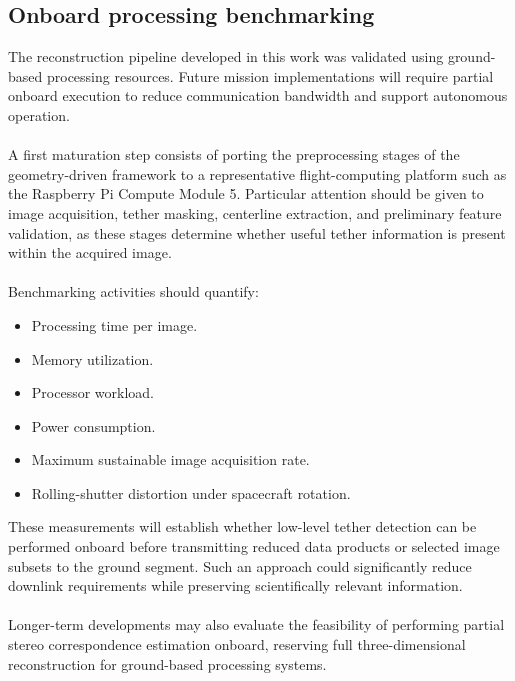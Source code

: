 \subsection{Onboard processing benchmarking}

The reconstruction pipeline developed in this work was validated using ground-based processing resources. Future mission implementations will require partial onboard execution to reduce communication bandwidth and support autonomous operation.
\\\\
A first maturation step consists of porting the preprocessing stages of the geometry-driven framework to a representative flight-computing platform such as the Raspberry Pi Compute Module 5. Particular attention should be given to image acquisition, tether masking, centerline extraction, and preliminary feature validation, as these stages determine whether useful tether information is present within the acquired image.
\\\\
Benchmarking activities should quantify:

\begin{itemize}
    \item Processing time per image.
    \item Memory utilization.
    \item Processor workload.
    \item Power consumption.
    \item Maximum sustainable image acquisition rate.
    \item Rolling-shutter distortion under spacecraft rotation.
\end{itemize}

These measurements will establish whether low-level tether detection can be performed onboard before transmitting reduced data products or selected image subsets to the ground segment. Such an approach could significantly reduce downlink requirements while preserving scientifically relevant information.
\\\\
Longer-term developments may also evaluate the feasibility of performing partial stereo correspondence estimation onboard, reserving full three-dimensional reconstruction for ground-based processing systems.

